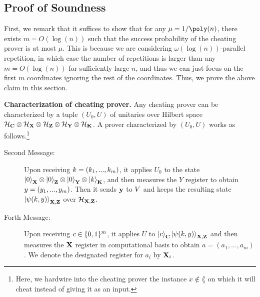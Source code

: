 \subsection{Proof of Soundness}\label{sec:proof_of_soundness}
First, we remark that it suffices to show that for any $\mu=1/\poly(n)$, there exists $m=O(\log(n))$ such that the success probability of the cheating prover is at most $\mu$.
This is because we are considering $\omega(\log(n))$-parallel repetition, in which case the number of repetitions is larger than   any $m=O(\log(n))$ for sufficiently large $n$, and thus we can just focus on  the first $m$ coordinates ignoring the rest of the coordinates.  
Thus, we prove the above claim in this section.


\noindent\textbf{Characterization of cheating prover.}
Any cheating prover can be characterized by a tuple $(U_0,U)$ of unitaries over Hilbert space $\mathcal{H}_{\mathbf{C}}\otimes \mathcal{H}_{\mathbf{X}}\otimes \mathcal{H}_{\mathbf{Z}} \otimes \mathcal{H}_{\mathbf{Y}}  \otimes \mathcal{H}_{\mathbf{K}}$. 
A prover characterized by $(U_0,U)$ works as follows.\footnote{Here, we hardwire into the cheating prover the instance $x\notin \lang$ on which it will cheat instead of giving it as an input.}
\begin{description}
\item[Second Message:] Upon receiving $k=(k_1,...,k_m)$, it applies $U_0$ to the state $\ket{0}_{\mathbf{X}}\otimes\ket{0}_{\mathbf{Z}}\otimes\ket{0}_{\mathbf{Y}}\otimes  \ket{k}_{\mathbf{K}}$, and then measures the $Y$ register to obtain $y=(y_1,...,y_m)$. Then it sends $\mathbf{y}$ to $V$ and keeps the resulting state $\ket{\psi(k,y)}_{\mathbf{X},\mathbf{Z}}$ over  $\mathcal{H}_{\mathbf{X},\mathbf{Z}}$.
\item [Forth Message:] Upon receiving $c\in \{0,1\}^{m}$, it applies $U$ to $\ket{c}_{\mathbf{C}}\ket{\psi(k,y)}_{\mathbf{X},\mathbf{Z}}$ and then measures the $\mathbf{X}$ register in computational basis to obtain $a=(a_1,...,a_m)$. We denote the designated register for $a_i$ by $\mathbf{X}_i$. %
\end{description}




